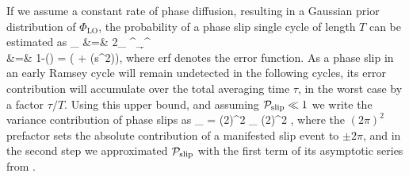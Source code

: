 If we assume a constant rate of phase diffusion, resulting in a Gaussian
prior distribution of  $\Phi_\mathrm{LO}$,
the probability of a phase slip single cycle of length
$T$ can be estimated as
\bal
	\label{eq:Pslip in T}
	\PP_ &=&  2\intop_\pi
	^{\infty}\d{\Phi_^}
	\exp{} \\
	&=& 1-\left(\right) =
	\label{eq:Pslip in T2}
	\left( +
	(s^2)\right)\exp{},
\eal
where erf denotes the error function.
 As a phase slip in an early Ramsey cycle will remain undetected in the following
cycles, its error contribution will accumulate over the total averaging time
$\tau$, in the worst case by a factor $\tau/T$.
Using this upper bound, and assuming $\mathcal{P}_\mathrm{slip  }\ll1$ we write the variance contribution of phase slips as
\bel
	\label{eq:Phase slip}
	_ = (2\pi)^2  \PP_
	\approx(2\pi)^2
	\exp{},
\eel
where the $(2\pi)^2$ prefactor sets the absolute contribution of a manifested
slip event to $\pm 2\pi$, and in the second step we approximated $\mathcal{P}_\mathrm{slip}$ with the
first term of its asymptotic series from .



